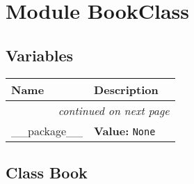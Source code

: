 %
%
%


\section{Module BookClass}

    \label{BookClass}


  \subsection{Variables}

    \vspace{-1cm}
\hspace{\varindent}\begin{longtable}{|p{\varnamewidth}|p{\vardescrwidth}|l}
\cline{1-2}
\cline{1-2} \centering \textbf{Name} & \centering \textbf{Description}& \\
\cline{1-2}
\endhead\cline{1-2}\multicolumn{3}{r}{\small\textit{continued on next page}}\\\endfoot\cline{1-2}
\endlastfoot\raggedright \_\-\_\-p\-a\-c\-k\-a\-g\-e\-\_\-\_\- & \raggedright \textbf{Value:} 
{\tt None}&\\
\cline{1-2}
\end{longtable}



\subsection{Class Book}

    \label{BookClass:Book}

